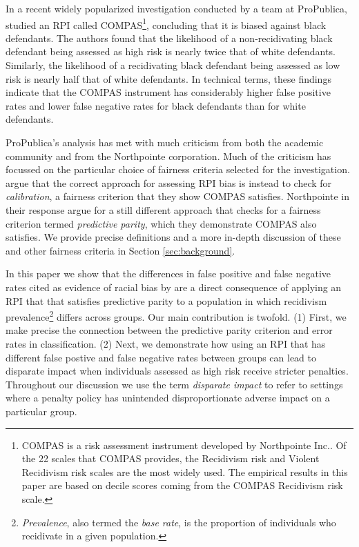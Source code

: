 \documentclass[11pt, svgnames]{article}
\numberwithin{equation}{section}
\theoremstyle{plain}
\theoremstyle{definition}
\numberwithin{prop}{section}
\numberwithin{corollary}{section}
\begin{document}
In a recent widely popularized investigation conducted by a team at ProPublica, \citet{propublica2016} studied an RPI called COMPAS\footnote{COMPAS \citep{compasfaq} is a risk assessment instrument developed by Northpointe Inc..  Of the 22 scales that COMPAS provides, the Recidivism risk and Violent Recidivism risk scales are the most widely used.  The empirical results in this paper are based on decile scores coming from the COMPAS Recidivism risk scale.}, concluding that it is biased against black defendants.  The authors found that the likelihood of a non-recidivating black defendant being assessed as high risk is nearly twice that of white defendants.  Similarly, the likelihood of a recidivating black defendant being assessed as low risk is nearly half that of white defendants.  In technical terms, these findings indicate that the COMPAS instrument has considerably higher false positive rates and lower false negative rates for black defendants than for white defendants.  

ProPublica's analysis has met with much criticism from both the academic community and from the Northpointe corporation.   Much of the criticism has focussed on the particular choice of fairness criteria selected for the investigation.  \citet{floresfalse} argue that the correct approach for assessing RPI bias is instead to check for \emph{calibration}, a fairness criterion that they show COMPAS satisfies.    Northpointe in their response\cite{dieterich2016compas} argue for a still different approach that checks for a fairness criterion termed \emph{predictive parity}, which they demonstrate COMPAS also satisfies.  We provide precise definitions and a more in-depth discussion of these and other fairness criteria in Section \ref{sec:background}.  

In this paper we show that the differences in false positive and false negative rates cited as evidence of racial bias by \citet{propublica2016} are a direct consequence of applying an RPI that that satisfies predictive parity to a population in which recidivism prevalence\footnote{\emph{Prevalence}, also termed the \emph{base rate}, is the proportion of individuals who recidivate in a given population.} differs across groups.   Our main contribution is twofold.  (1) First, we make precise the connection between the predictive parity criterion and error rates in classification.  (2) Next, we demonstrate how using an RPI that has different false postive and false negative rates between groups can lead to disparate impact when individuals assessed as high risk receive stricter penalties.  Throughout our discussion we use the term \emph{disparate impact} to refer to settings where a penalty policy has unintended disproportionate adverse impact on a particular group.
\end{document}
